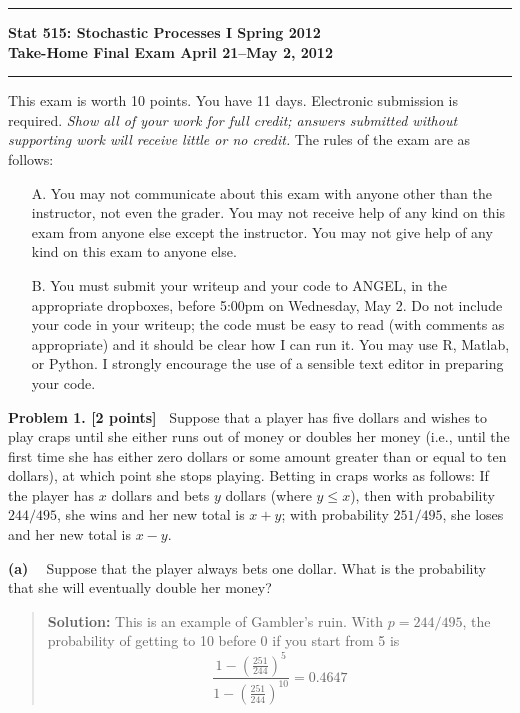 \documentclass{article}
\newcommand{\svskip}{\vspace{.2in}}
\newcommand{\mvskip}{\vspace{.25in}}
\newcommand{\lvskip}{\vspace{.5in}}
\begin{document}
        \hrule
        \begin{center}
        \Large\bf Stat 515: Stochastic Processes I \hfill Spring 2012\\
        Take-Home Final Exam  \hfill April 21--May 2, 2012
        \end{center}
        \hrule


\mvskip 
This exam is worth 10 points.  You have 11 days.  Electronic submission
is required.  {\em Show all of your work for full credit; answers submitted without
supporting work will receive little or no credit.}  
The rules of the exam are as follows:

\begin{enumerate}
\item[A.]
You may not communicate about this exam with anyone other than the instructor, not even the grader. You may not receive help of any kind on this exam from anyone else except the instructor. You may not give help of any kind on this exam to anyone else.
\item [B.]
You must submit your writeup and your code to ANGEL, in the appropriate dropboxes, before 5:00pm on Wednesday, May 2.  Do not include your code in your writeup; the code must be easy to read (with comments as appropriate) and it should be clear how I can run it.  You may use R, Matlab, or Python.  I strongly encourage the use of a sensible text editor in preparing your code.
\end{enumerate}



\lvskip 
{\bf Problem 1. [2 points]\ } 
Suppose that a player has five dollars and wishes to play craps until she either runs out of money or 
doubles her money (i.e., until the first time she has either zero dollars or some amount greater than
or equal to ten dollars), at which point she stops playing.   
Betting in craps works as follows:  If the player has $x$ dollars and
bets $y$ dollars (where $y\le x$), then 
with probability $244/495$, she wins and her new total is $x+y$; with probability
$251/495$, she loses and her new total is $x-y$.

\svskip
{\bf(a) \ }
Suppose that the player always bets one dollar.  What is the probability that she will eventually
double her money?
\begin{quotation}{\bf Solution:}
This is an example of Gambler's ruin.  With $p=244/495$, the probability
of getting to 10 before 0 if you start from 5 is
\[
\frac{1 - \left( \frac{251}{244} \right)^5 }{1 - \left( \frac{251}{244} \right)^{10}} = 0.4647
\]
\end{quotation}
\end{document}
